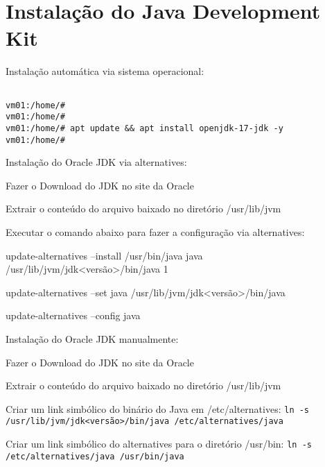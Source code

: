 \section{Instalação do Java Development Kit}

Instalação automática via sistema operacional:


\begin{lstlisting}[breaklines=true,basicstyle=\firacoderetina,
breaklines=true,caption=\firacoderetina Instalando pacotes openjdk,
postbreak=\mbox{\textcolor{red}{$\hookrightarrow$}\space},
showstringspaces=false]

vm01:/home/#		
vm01:/home/# 		
vm01:/home/# apt update && apt install openjdk-17-jdk -y 
vm01:/home/#

\end{lstlisting}	

Instalação do Oracle JDK via alternatives:

\begin{list}{•}{}
	\setlength{\leftskip}{1.5cm}
	\setlength{\rightskip}{0pt plus 1.0cm}
	\setlength{\parindent}{-1.5cm}
\item Fazer o Download do JDK no site da Oracle
\item Extrair o conteúdo do arquivo baixado no diretório /usr/lib/jvm
\item Executar o comando abaixo para fazer a configuração via alternatives:
\item update-alternatives --install /usr/bin/java java /usr/lib/jvm/jdk<versão>/bin/java 1
\item update-alternatives --set java /usr/lib/jvm/jdk<versão>/bin/java
\item update-alternatives --config java
\end{list}

Instalação do Oracle JDK manualmente:

\begin{list}{•}{}
	\setlength{\leftskip}{1.5cm} 
	\setlength{\rightskip}{0pt plus 1.0cm}
	\setlength{\parindent}{-1.5cm}
\item Fazer o Download do JDK no site da Oracle
\item Extrair o conteúdo do arquivo baixado no diretório /usr/lib/jvm
\item Criar um link simbólico do binário do Java em /etc/alternatives:\newline
	{\small \texttt{ln -s /usr/lib/jvm/jdk<versão>/bin/java /etc/alternatives/java}}
\item Criar um link simbólico do alternatives para o diretório /usr/bin:\newline
	{\small \texttt{ln -s /etc/alternatives/java /usr/bin/java}}
\end{list}
